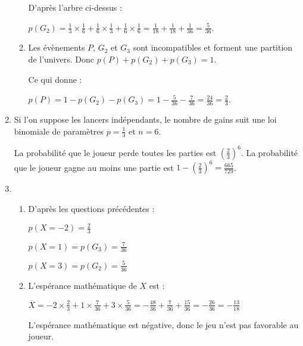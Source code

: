 \begin{corrige}
\begin{enumerate}
\begin{enumerate}[label=\alph*.]
\begin{center}
\begin{extern}
{
      }
   \end{extern}
\end{center}
D'après l'arbre ci-dessus :
               \par
               $p\left(G_{2}\right)=\frac{1}{3}\times \frac{1}{6}+\frac{1}{6}\times \frac{1}{3}+\frac{1}{6}\times \frac{1}{6}=\frac{1}{18}+\frac{1}{18}+\frac{1}{36}=\frac{5}{36}$.
               \item
               Les évènements $P$, $G_{2}$ et $G_{3}$ sont incompatibles et forment une partition de l'univers. Donc $p\left(P\right)+p\left(G_{2}\right)+p\left(G_{3}\right)=1$.
               \par
               Ce qui donne :
               \par
               $p\left(P\right)=1-p\left(G_{2}\right)-p\left(G_{3}\right)=1-\frac{5}{36}-\frac{7}{36}=\frac{24}{36}=\frac{2}{3}$.
          \end{enumerate}
          \item
          Si l'on suppose les lancers indépendants, le nombre de gains suit une loi binomiale de paramètres $p=\frac{1}{3}$ et $n=6$.
          \par
          La probabilité que le joueur perde toutes les parties est $\left(\frac{2}{3}\right)^{6}$. La probabilité que le joueur gagne au moins une partie est $1-\left(\frac{2}{3}\right)^{6}=\frac{665}{729}$.
          \item
          \begin{enumerate}[label=\alph*.]
               \item
               D'après les questions précédentes :
               \par
               $p\left(X=-2\right)=\frac{2}{3}$
               \par
               $p\left(X=1\right)=p\left(G_{3}\right)=\frac{7}{36}$
               \par
               $p\left(X=3\right)=p\left(G_{2}\right)=\frac{5}{36}$
               \item
               L'espérance mathématique de $X$ est :
               \par
               $\overline{X}=-2\times \frac{2}{3}+1\times \frac{7}{36}+3\times \frac{5}{36}=-\frac{48}{36}+\frac{7}{36}+\frac{15}{36}=-\frac{26}{36}=-\frac{13}{18}$
               \par
               L'espérance mathématique est négative, donc le jeu n'est pas favorable au joueur.
          \end{enumerate}
     \end{enumerate}
\end{corrige}

